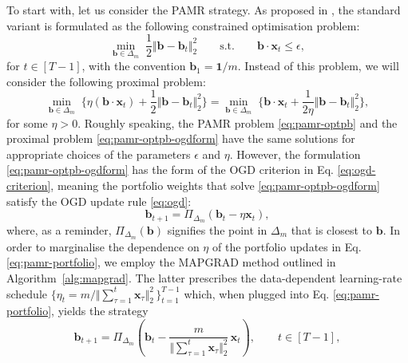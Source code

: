 To start with, let us consider the PAMR strategy. As proposed in \citep{pamr}, the standard variant is formulated as the following constrained optimisation problem:
\begin{equation}
\label{eq:pamr-optpb}
	\min_{\mathbf{b}\in\Delta_m} \; \frac{1}{2}\Vert\mathbf{b} - \mathbf{b}_t\Vert_2^2
	\qquad \text{s.t.} \qquad \mathbf{b} \cdot \mathbf{x}_t \leq \epsilon,
\end{equation}
for $t \in [T-1]$, with the convention $\mathbf{b}_1 = \mathbf{1} / m$. Instead of this problem, we will consider the following proximal problem:
\begin{equation}
\label{eq:pamr-optpb-ogdform}
	\min_{\mathbf{b}\in\Delta_m} \; \Big\{\eta(\mathbf{b} \cdot \mathbf{x}_t) + \frac{1}{2}\Vert\mathbf{b} - \mathbf{b}_t\Vert_2^2\Big\}
	= \min_{\mathbf{b}\in\Delta_m} \; \Big\{\mathbf{b} \cdot \mathbf{x}_t + \frac{1}{2\eta}\Vert\mathbf{b} - \mathbf{b}_t\Vert_2^2\Big\},
\end{equation}
for some $\eta > 0$.
Roughly speaking, the PAMR problem \eqref{eq:pamr-optpb} and the proximal problem \eqref{eq:pamr-optpb-ogdform} have the same solutions for appropriate choices of the parameters $\epsilon$ and $\eta$.
However, the formulation \eqref{eq:pamr-optpb-ogdform} has the form of the OGD criterion in Eq. \eqref{eq:ogd-criterion}, meaning the portfolio weights that solve \eqref{eq:pamr-optpb-ogdform} satisfy the OGD update rule \eqref{eq:ogd}:
\begin{equation}
\label{eq:pamr-portfolio}
	\mathbf{b}_{t+1} = \Pi_{\Delta_m}(\mathbf{b}_t - \eta\mathbf{x}_t),
\end{equation}
where, as a reminder, $\Pi_{\Delta_m}(\mathbf{b})$ signifies the point in $\Delta_m$ that is closest to $\mathbf{b}$.
In order to marginalise the dependence on $\eta$ of the portfolio updates in Eq. \eqref{eq:pamr-portfolio}, we employ the MAPGRAD method outlined in Algorithm~\ref{alg:mapgrad}. The latter prescribes the data-dependent learning-rate schedule $\{\eta_t = m / \Vert\sum_{\tau=1}^{t}\mathbf{x}_\tau\Vert^2_2\,\}_{t=1}^{T-1}$ which, when plugged into Eq. \eqref{eq:pamr-portfolio}, yields the strategy
\begin{equation}
\label{eq:adapamr-portfolio}
	\mathbf{b}_{t+1}
	= \Pi_{\Delta_m}\left(\mathbf{b}_t - \frac{m}{\Vert\sum_{\tau=1}^{t}\mathbf{x}_\tau\Vert^2_2}\,\mathbf{x}_t\right),
	\qquad t \in [T-1],
\end{equation}
